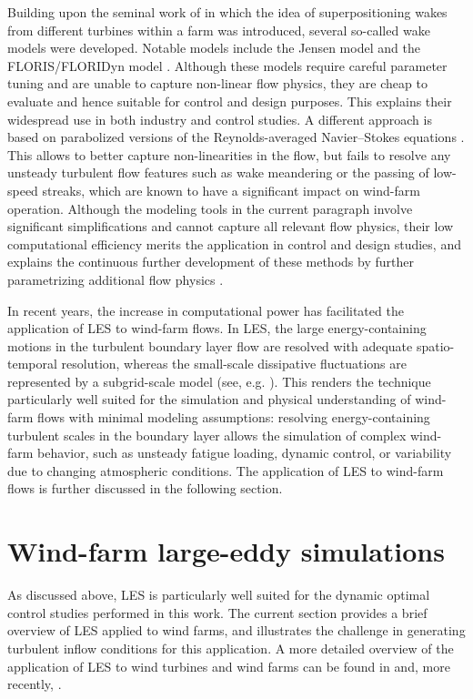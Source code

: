 Building upon the seminal work of \cite{lissaman} in which the idea of superpositioning wakes from different turbines within a farm was introduced, several so-called wake models were developed. Notable models include the Jensen model \citep{katic1986simple, jensen1983note} and the FLORIS/FLORIDyn model \citep{gebraad2014data, gebraad2014control}. Although these models require careful parameter tuning and are unable to capture non-linear flow physics, they are cheap to evaluate and hence suitable for control and design purposes. This explains their widespread use in both industry and control studies. A different approach is based on parabolized versions of the Reynolds-averaged Navier--Stokes equations \citep{ainslie88, crespo1988experimental, van2006improvements}. This allows to better capture non-linearities in the flow, but fails to resolve any unsteady turbulent flow features such as wake meandering or the passing of low-speed streaks, which are known to have a significant impact on wind-farm operation. Although the modeling tools in the current paragraph involve significant simplifications and cannot capture all relevant flow physics, their low computational efficiency merits the application in control and design studies, and explains the continuous further development of these methods by further parametrizing additional flow physics \citep{larsen2008wake, keck2014atmospheric, gebraad2016incorporating}. 

In recent years, the increase in computational power has facilitated the application of LES to wind-farm flows. In LES, the large energy-containing motions in the turbulent boundary layer flow are resolved with adequate spatio-temporal resolution, whereas the small-scale dissipative fluctuations are represented by a subgrid-scale model (see, e.g. \citealp{sagaut2006large}). This renders the technique particularly well suited for the simulation and physical understanding of wind-farm flows with minimal modeling assumptions: resolving energy-containing turbulent scales in the boundary layer allows the simulation of complex wind-farm behavior, such as unsteady fatigue loading, dynamic control, or variability due to changing atmospheric conditions. The application of LES to wind-farm flows is further discussed in the following section. 

\section{Wind-farm large-eddy simulations}\label{sec:intro_les}
As discussed above, LES is particularly well suited for the dynamic optimal control studies performed in this work. The current section provides a brief overview of LES applied to wind farms, and illustrates the challenge in generating turbulent inflow conditions for this application. A more detailed overview of the application of LES to wind turbines and wind farms can be found in \cite{sanderse2011review,mehta2014large} and, more recently, \cite{breton2017survey}. 

